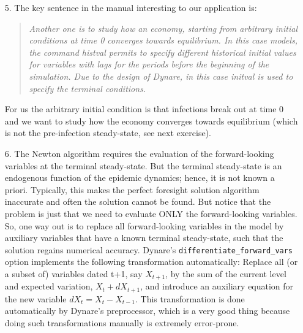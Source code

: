 \begin{itemize}
\item[5.] The key sentence in the manual interesting to our application is:
\begin{quote}
\emph{Another one is to study how an economy, starting from arbitrary initial conditions at time 0 converges towards equilibrium.
In this case models, the command histval permits to specify different historical initial values for variables with lags for the periods before the beginning of the simulation.
Due to the design of Dynare, in this case initval is used to specify the terminal conditions.}
\end{quote}
For us the arbitrary initial condition is that infections break out at time 0
  and we want to study how the economy converges towards equilibrium (which is not the pre-infection steady-state, see next exercise).


\item[6.] The Newton algorithm requires the evaluation of the forward-looking variables at the terminal steady-state.
But the terminal steady-state is an endogenous function of the epidemic dynamics;
  hence, it is not known a priori.
Typically, this makes the perfect foresight solution algorithm inaccurate and often the solution cannot be found.
But notice that the problem is just that we need to evaluate ONLY the forward-looking variables.
So, one way out is to replace all forward-looking variables in the model by auxiliary variables
  that have a known terminal steady-state, such that the solution regains numerical accuracy.
Dynare's \texttt{differentiate\_forward\_vars} option implements the following transformation automatically:
Replace all (or a subset of) variables dated t+1, say \(X_{t+1}\),
  by the sum of the current level and expected variation, \(X_t + dX_{t+1}\),
  and introduce an auxiliary equation for the new variable \(dX_t=X_t-X_{t-1}\).
This transformation is done automatically by Dynare's preprocessor,
  which is a very good thing because doing such transformations manually is extremely error-prone.


\end{itemize}
